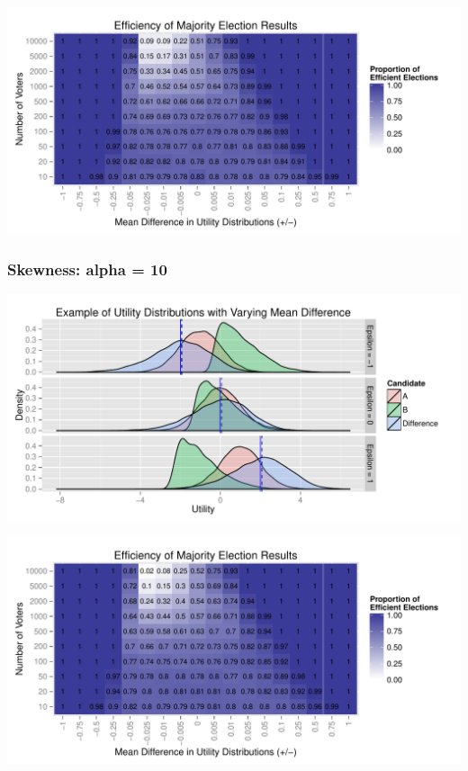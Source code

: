 \documentclass[12pt]{scrartcl}\usepackage[]{graphicx}\usepackage[]{color}
\makeatletter
\def\maxwidth{ %
  \ifdim\Gin@nat@width>\linewidth
    \linewidth
  \else
    \Gin@nat@width
  \fi
}
\newenvironment{knitrout}{}{} %
\makeatother
\begin{document}
\begin{knitrout}
\color{fgcolor}
\includegraphics[width=\maxwidth]{figure/unnamed-chunk-9} 

\end{knitrout}


\clearpage
\subsubsection{Skewness: alpha = 10}
\begin{knitrout}
\color{fgcolor}
\includegraphics[width=\maxwidth]{figure/unnamed-chunk-10} 

\end{knitrout}


\begin{knitrout}
\color{fgcolor}
\includegraphics[width=\maxwidth]{figure/unnamed-chunk-11} 

\end{knitrout}
\end{document}
